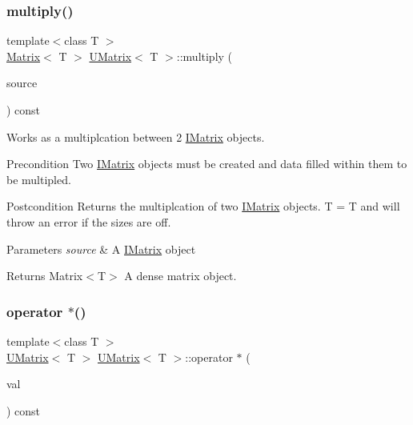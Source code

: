 \subsubsection{\texorpdfstring{multiply()}{multiply()}\hspace{0.1cm}{\footnotesize\ttfamily [6/6]}}
{\footnotesize\ttfamily template$<$class T $>$ \\
\mbox{\hyperlink{class_matrix}{Matrix}}$<$ T $>$ \mbox{\hyperlink{class_u_matrix}{U\+Matrix}}$<$ T $>$\+::multiply (\begin{DoxyParamCaption}\item[{const \mbox{\hyperlink{class_i_matrix}{I\+Matrix}}$<$ \mbox{\hyperlink{class_d_matrix}{D\+Matrix}}$<$ T $>$, T $>$ \&}]{source }\end{DoxyParamCaption}) const}



Works as a multiplcation between 2 \mbox{\hyperlink{class_i_matrix}{I\+Matrix}} objects. 

\begin{DoxyPrecond}{Precondition}
Two \mbox{\hyperlink{class_i_matrix}{I\+Matrix}} objects must be created and data filled within them to be multipled. 
\end{DoxyPrecond}
\begin{DoxyPostcond}{Postcondition}
Returns the multiplcation of two \mbox{\hyperlink{class_i_matrix}{I\+Matrix}} objects. T = T and will throw an error if the sizes are off.
\end{DoxyPostcond}

\begin{DoxyParams}{Parameters}
{\em source} & A \mbox{\hyperlink{class_i_matrix}{I\+Matrix}} object \\
\hline
\end{DoxyParams}
\begin{DoxyReturn}{Returns}
Matrix$<$\+T$>$ A dense matrix object. 
\end{DoxyReturn}
\mbox{\label{class_u_matrix_a7b1875cfc49b374875dac2a58948f3ac}} 
\subsubsection{\texorpdfstring{operator $\ast$()}{operator *()}}
{\footnotesize\ttfamily template$<$class T $>$ \\
\mbox{\hyperlink{class_u_matrix}{U\+Matrix}}$<$ T $>$ \mbox{\hyperlink{class_u_matrix}{U\+Matrix}}$<$ T $>$\+::operator $\ast$ (\begin{DoxyParamCaption}\item[{const T \&}]{val }\end{DoxyParamCaption}) const\hspace{0.3cm}{\ttfamily [virtual]}}



